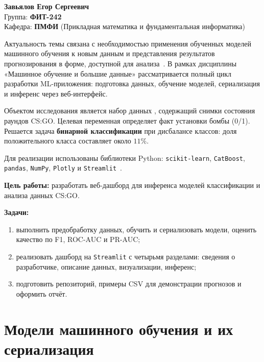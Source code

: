 \documentclass[14pt,a4paper]{extarticle}
\begin{document}
\begin{center}
{\large \textbf{Завьялов Егор Сергеевич}}\\
Группа: \textbf{ФИТ-242}\\
Кафедра: \textbf{ПМФИ} (Прикладная математика и фундаментальная информатика)
\end{center}
\vspace{0.5em}

\tableofcontents
\newpage


Актуальность темы связана с необходимостью применения обученных моделей машинного обучения к новым данным и представления результатов прогнозирования в форме, доступной для анализа~\cite{pareto,gigaspaces}. В рамках дисциплины «Машинное обучение и большие данные» рассматривается полный цикл разработки ML-приложения: подготовка данных, обучение моделей, сериализация и инференс через веб-интерфейс.

Объектом исследования является набор данных , содержащий снимки состояния раундов CS:GO. Целевая переменная  определяет факт установки бомбы (0/1). Решается задача \textbf{бинарной классификации} при дисбалансе классов: доля положительного класса составляет около $11\%$.

Для реализации использованы библиотеки Python: \texttt{scikit-learn}, \texttt{CatBoost}, \texttt{pandas}, \texttt{NumPy}, \texttt{Plotly} и \texttt{Streamlit}~\cite{sklearn,streamlit,catboost}.

\textbf{Цель работы:} разработать веб-дашборд для инференса моделей классификации и анализа данных CS:GO.

\textbf{Задачи:}
\begin{enumerate}
  \item выполнить предобработку данных, обучить и сериализовать модели, оценить качество по F1, ROC-AUC и PR-AUC;
  \item реализовать дашборд на \texttt{Streamlit} с четырьмя разделами: сведения о разработчике, описание данных, визуализации, инференс;
  \item подготовить репозиторий, примеры CSV для демонстрации прогнозов и оформить отчёт.
\end{enumerate}


\section{Модели машинного обучения и их сериализация}
\end{document}
